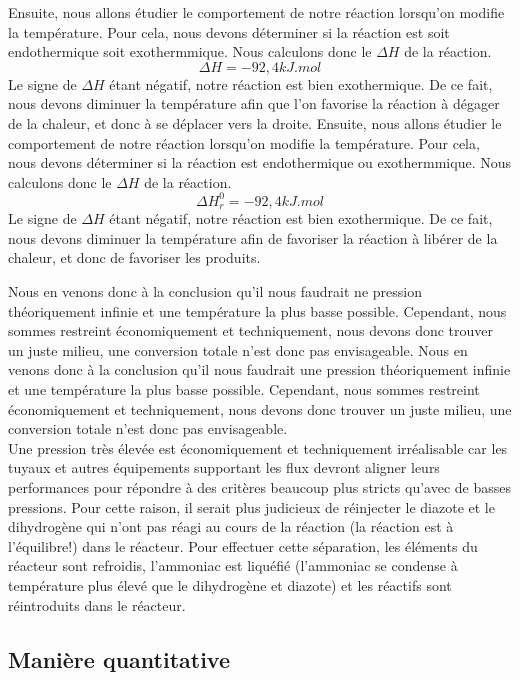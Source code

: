\documentclass[10pt,a4paper]{article}
\begin{document}
Ensuite, nous allons étudier le comportement de notre réaction lorsqu'on modifie la température. Pour cela, nous devons déterminer si la réaction est soit endothermique soit exothermmique. Nous calculons donc le $\Delta H$  de la réaction. $$\Delta H = \unit{-92,4}{kJ.mol}$$
Le signe de $\Delta H$ étant négatif, notre réaction est bien exothermique. De ce fait, nous devons diminuer la température afin que l'on favorise la réaction à dégager de la chaleur, et donc à se déplacer vers la droite.
Ensuite, nous allons étudier le comportement de notre réaction lorsqu'on modifie la température. Pour cela, nous devons déterminer si la réaction est endothermique ou exothermmique. Nous calculons donc le $\Delta H$  de la réaction. $$\Delta H^0_r = \unit{-92,4}{kJ.mol}$$
Le signe de $\Delta H$ étant négatif, notre réaction est bien exothermique. De ce fait, nous devons diminuer la température afin de favoriser la réaction à libérer de la chaleur, et donc de favoriser les produits.

Nous en venons donc à la conclusion qu'il nous faudrait ne pression théoriquement infinie et une température la plus basse possible. Cependant, nous sommes restreint économiquement et techniquement, nous devons donc trouver un juste milieu, une conversion totale n'est donc pas envisageable. 
Nous en venons donc à la conclusion qu'il nous faudrait une pression théoriquement infinie et une température la plus basse possible. Cependant, nous sommes restreint économiquement et techniquement, nous devons donc trouver un juste milieu, une conversion totale n'est donc pas envisageable. 
\\

Une pression très élevée est économiquement et techniquement irréalisable car les tuyaux et autres équipements supportant les flux devront aligner leurs performances pour répondre à des critères beaucoup plus stricts qu'avec de basses pressions.
Pour cette raison, il serait plus judicieux de réinjecter  le diazote et le dihydrogène qui n'ont pas réagi au cours de la réaction (la réaction est à l'équilibre!) dans le réacteur. Pour effectuer cette séparation, les éléments du réacteur sont refroidis, l'ammoniac est liquéfié (l'ammoniac se condense à température plus élevé que le dihydrogène et diazote) et les réactifs sont réintroduits dans le réacteur.

\subsection{Manière quantitative}
\end{document}
